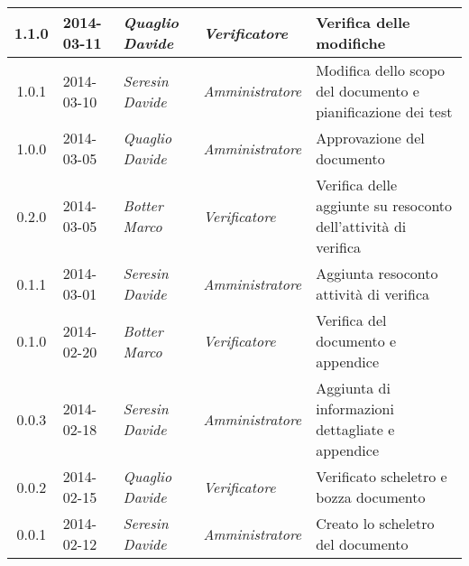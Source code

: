 \begin{small}
\begin{tabular}{|c|p{1.8cm}|p{2.8cm}|p{2.8cm}|p{3.5cm}|}
\hline
1.1.0 & 2014-03-11 & 
\textit{Quaglio Davide} &
\textit{Verificatore} &  Verifica delle modifiche\\
\hline
1.0.1 & 2014-03-10 & 
\textit{Seresin Davide} &
\textit{Amministratore} &  Modifica dello scopo del documento e pianificazione dei test\\
\hline
1.0.0 & 2014-03-05 & 
\textit{Quaglio Davide} &
\textit{Amministratore} &  Approvazione del documento\\
\hline
0.2.0 & 2014-03-05 & 
\textit{Botter Marco} &
\textit{Verificatore} &  Verifica delle aggiunte su resoconto dell'attività di verifica\\
\hline
0.1.1 & 2014-03-01 & 
\textit{Seresin Davide} &
\textit{Amministratore} &  Aggiunta resoconto attività di verifica\\
\hline
0.1.0 & 2014-02-20 & 
\textit{Botter Marco} &
\textit{Verificatore} &  Verifica del documento e appendice\\
\hline
0.0.3 & 2014-02-18 & 
\textit{Seresin Davide} &
\textit{Amministratore} &  Aggiunta di informazioni dettagliate e appendice\\
\hline
0.0.2 & 2014-02-15 & 
\textit{Quaglio Davide} &
\textit{Verificatore} &  Verificato scheletro e bozza documento\\
\hline
0.0.1 & 2014-02-12 & 
\textit{Seresin Davide} &
\textit{Amministratore} &  Creato lo scheletro del documento\\
\hline
\end{tabular}\\
\end{small}